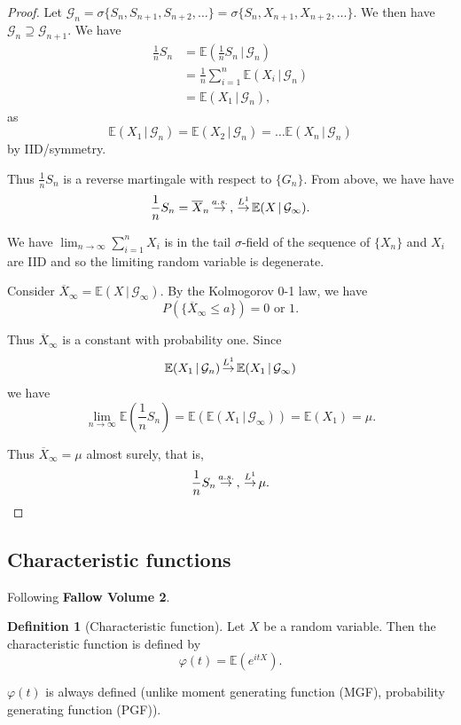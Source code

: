 \documentclass[10pt, oneside, reqno]{amsart}
\theoremstyle{plain}%
\theoremstyle{definition}
\newtheorem{defn}[thm]{Definition}
\theoremstyle{remark}
\newcommand{\given}{ \, | \,}
\renewcommand{\phi}{\varphi}
\newcommand{\E}{\mathbb{E}}
\def\cas{\,{\buildrel a.s. \over \rightarrow}\,}
\def\clone{\,{\buildrel L^1 \over \rightarrow}\,}
\newcommand{\sigg}{\mathcal{G}}
\newcommand{\sumni}{\sum_{i=1}^n}
\begin{document}
\begin{proof}
    Let $\sigg_n = \sigma \{ S_n , S_{n+1}, S_{n+2}, \dots \} = \sigma \{ S_n, X_{n+1}, X_{n+2}, \dots \}$.  We then have $\sigg_n \supseteq \sigg_{n+1}$. We have \begin{align*}
        \frac{1}{n} S_n &= \E(\frac{1}{n} S_n \given \sigg_n) \\
            &= \frac{1}{n} \sumni \E(X_i \given \sigg_n) \\
            &= \E(X_1 \given \sigg_n),
    \end{align*}  as \[
        \E(X_1 \given \sigg_n) = \E(X_2 \given \sigg_n) = \dots \E(X_n \given \sigg_n)
    \] by IID/symmetry.
    
    Thus $\frac{1}{n} S_n$ is a reverse martingale with respect to $\{ G_n \}$.  From above, we have have \[
        \frac{1}{n} S_n = \overline X_n \cas, \clone \E(X \given \sigg_\infty). 
    \]
    
    We have $\lim_{ n \rightarrow \infty} \sumni X_i$ is in the tail $\sigma$-field of the sequence of $\{ X_n \}$ and $X_i$ are IID and so the limiting random variable is degenerate.  
    
    Consider $\overline X_\infty = \E(X \given \sigg_\infty)$.  By the Kolmogorov 0-1 law, we have \[
        P(\{ \overline X_\infty \leq a \}) = \text{0 or 1}.   
    \]
    
    Thus $\overline X_\infty$ is a constant with probability one.  Since \begin{align*}
        \E(X_1 \given \sigg_n) \clone \E(X_1 \given \sigg_\infty)
    \end{align*}  we have \[
        \lim_{n \rightarrow \infty} \E(\frac{1}{n} S_n) = \E( \E(X_1 \given \sigg_\infty)) = \E(X_1) = \mu.
    \]
    
    Thus $\overline X_\infty = \mu$ almost surely, that is, \[
        \frac{1}{n} S_n \cas, \clone \mu.
    \]
\end{proof}

\subsection{Characteristic functions} %
\label{sub:characteristic_functions}

Following \textbf{Fallow Volume 2}.
\begin{defn}[Characteristic function]
    Let $X$ be a random variable. Then the characteristic function is defined by \[\phi(t) = \E(e^{itX}).\]  
    
    $\phi(t)$ is always defined (unlike moment generating function (MGF), probability generating function (PGF)). 

\end{defn}
\end{document}
